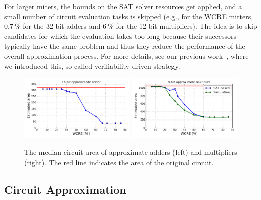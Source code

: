 \documentclass[runningheads]{llncs}
\begin{document}
For larger miters, the bounds on the SAT solver resources get applied, and a
small number of circuit evaluation tasks is skipped (e.g., for the WCRE mitters,
$0.7\ \%$ for the 32-bit adders and $6\ \%$ for the 12-bit multipliers). The
idea is to skip candidates for which the evaluation takes too long because their
successors typically have the same problem and thus they reduce the performance
of the overall approximation process. For more details, see our previous
work~\cite{iccad17}, where we introduced this, so-called verifiability-driven
strategy.

\begin{figure}[t]
    \centering
    \includegraphics[width=0.49\textwidth]{img/prezentace/medians-addApprox16-area.pdf}
        \includegraphics[width=0.49\textwidth]{img/prezentace/medians-multApprox8-area.pdf}
        \vspace{-0.9em}
    \caption{The median circuit area of approximate adders (left) and multipliers 
    (right). The red line indicates the area of the original circuit.}
    \label{fig:adders}
    \vspace{-1em}
\end{figure}

\subsection{Circuit Approximation}
\end{document}
